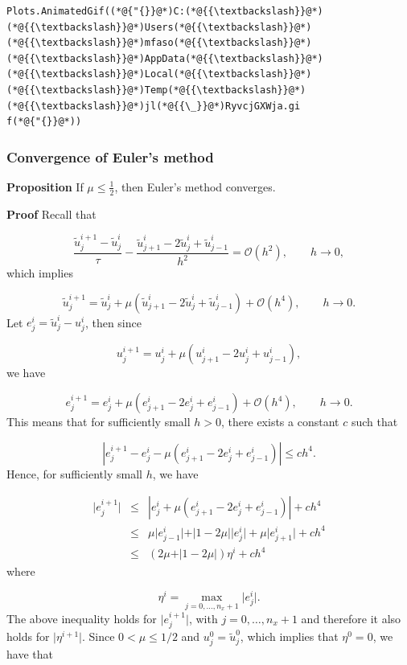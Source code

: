 \documentclass[12pt,a4paper]{article}
\begin{document}
\begin{lstlisting}
Plots.AnimatedGif((*@{"{}}@*)C:(*@{{\textbackslash}}@*)(*@{{\textbackslash}}@*)Users(*@{{\textbackslash}}@*)(*@{{\textbackslash}}@*)mfaso(*@{{\textbackslash}}@*)(*@{{\textbackslash}}@*)AppData(*@{{\textbackslash}}@*)(*@{{\textbackslash}}@*)Local(*@{{\textbackslash}}@*)(*@{{\textbackslash}}@*)Temp(*@{{\textbackslash}}@*)(*@{{\textbackslash}}@*)jl(*@{{\_}}@*)RyvcjGXWja.gi
f(*@{"{}}@*))
\end{lstlisting}


\subsubsection{Convergence of Euler's method}
\textbf{Proposition} If $\mu \leq \frac{1}{2}$, then Euler's method converges.

\textbf{Proof} Recall that

\[
\frac{\tilde{u}^{i+1}_j - \tilde{u}^i_j}{\tau} - \frac{\tilde{u}^{i}_{j+1} - 2\tilde{u}^i_j + \tilde{u}^i_{j-1}}{h^2}  =  \mathcal{O}(h^2), \qquad h \to 0,
\]
which implies

\[
\tilde{u}^{i+1}_j = \tilde{u}^i_j + \mu \left(\tilde{u}^{i}_{j+1} - 2\tilde{u}^i_j + \tilde{u}^i_{j-1}\right)  +  \mathcal{O}(h^4), \qquad h \to 0.
\]
Let $e^i_j = \tilde{u}^i_j - u^i_j$, then since

\[
u^{i+1}_j = u^i_j + \mu \left( u^{i}_{j+1} - 2u^i_j + u^i_{j-1}  \right),
\]
we have

\[
e^{i+1}_j = e^i_j + \mu \left( e^{i}_{j+1} - 2e^i_j + e^i_{j-1}  \right) + \mathcal{O}(h^4), \qquad h \to 0.
\]
This means that for sufficiently small $h > 0$, there exists a constant $c$ such that 

\[
\left\vert e^{i+1}_j -  e^i_j - \mu \left( e^{i}_{j+1} - 2e^i_j + e^i_{j-1}  \right) \right\vert  \leq ch^4.
\]
Hence, for sufficiently small $h$, we have


\begin{eqnarray*}
\vert e^{i+1}_j \vert &\leq& \left\vert e^i_j + \mu ( e^{i}_{j+1} - 2e^i_j + e^i_{j-1} ) \right\vert + ch^4\\
 & \leq & \mu \vert e^i_{j-1} \vert + \vert 1 - 2\mu \vert \vert e^i_{j} \vert  + \mu \vert e^i_{j+1} \vert + ch^4  \\
 & \leq & \left(2\mu  + \vert 1 - 2\mu \vert \right) \eta^i  + ch^4  
\end{eqnarray*}
where 

\[
\eta^{i} = \max_{j = 0, \ldots, n_x+1}\vert e^i_j \vert.
\]
The above inequality holds for $\vert e^{i+1}_j \vert$, with $j = 0, \ldots, n_x+1$ and therefore it also holds for $\vert  \eta^{i+1} \vert$. Since $0 < \mu \leq 1/2$ and $u^0_j = \tilde{u}^0_j$, which implies that $\eta^0=0$, we have that
\end{document}

